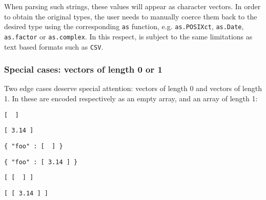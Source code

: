 When parsing such \JSON strings, these values will appear as character vectors. In order to obtain the original types, the user needs to manually coerce them back to the desired type using the corresponding \texttt{as} function, e.g. \texttt{as.POSIXct}, \texttt{as.Date}, \texttt{as.factor} or \texttt{as.complex}. In this respect, \JSON is subject to the same limitations as text based formats such as \texttt{CSV}.

\subsubsection{Special cases: vectors of length 0 or 1}

Two edge cases deserve special attention: vectors of length 0 and vectors of length 1. In \jsonlite these are encoded respectively as an empty array, and an array of length 1:

\begin{knitrout}\mycodesize
{}\color{fgcolor}\begin{kframe}
\begin{alltt}
\hlstd{(}\hlstd{(}\hlstd{()))}
\end{alltt}
\begin{verbatim}
[  ]
\end{verbatim}
\begin{alltt}
\hlstd{(}
\end{alltt}
\begin{verbatim}
[ 3.14 ]
\end{verbatim}
\begin{alltt}
\hlstd{(}\hlstd{(}\hlstd{(} \hlstd{=} \hlstd{())))}
\end{alltt}
\begin{verbatim}
{ "foo" : [  ] }
\end{verbatim}
\begin{alltt}
\hlstd{(}\hlstd{(}\hlstd{(} 
\end{alltt}
\begin{verbatim}
{ "foo" : [ 3.14 ] }
\end{verbatim}
\begin{alltt}
\hlstd{(}\hlstd{(}\hlstd{(}\hlstd{())))}
\end{alltt}
\begin{verbatim}
[ [  ] ]
\end{verbatim}
\begin{alltt}
\hlstd{(}\hlstd{(}
\end{alltt}
\begin{verbatim}
[ [ 3.14 ] ]
\end{verbatim}
\end{kframe}
\end{knitrout}



